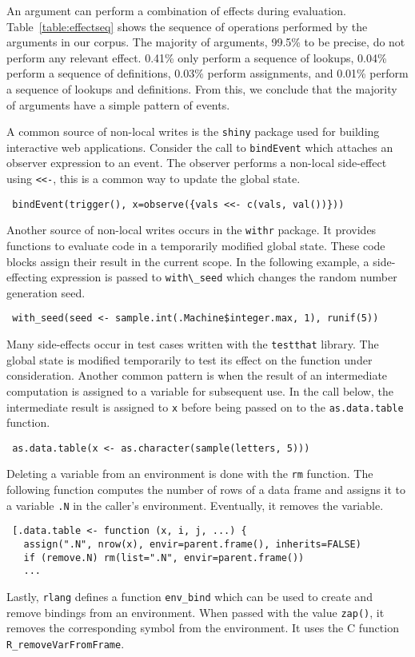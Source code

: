 \documentclass[review,creen,acmsmall]{acmart}
\newcommand{\code}[1]{\lstinline |#1|\xspace}
\renewcommand{\c}[1]{\lstinline |#1|\xspace}
\begin{document}
An argument can perform a combination of effects during evaluation.
Table~\ref{table:effectseq} shows the sequence of operations performed by the
arguments in our corpus. The majority of arguments, 99.5\% to be precise, do not
perform any relevant effect. 0.41\% only perform a sequence of lookups, 0.04\%
perform a sequence of definitions, 0.03\% perform assignments, and 0.01\%
perform a sequence of lookups and definitions. From this, we conclude that
the majority of arguments have a simple pattern of events.

A common source of non-local writes is the \c{shiny} package used for building
interactive web applications. Consider the call to \code{bindEvent} which
attaches an observer expression to an event. The observer performs a non-local
side-effect using \code{<<-}, this is a common way to update the global state.
%
\begin{lstlisting}
 bindEvent(trigger(), x=observe({vals <<- c(vals, val())}))
\end{lstlisting}
%
\noindent
Another source of non-local writes occurs in the \code{withr} package. It
provides functions to evaluate code in a temporarily modified global state. These
code blocks assign their result in the current scope. In the following example, a
side-effecting expression is passed to \code{with\_seed} which changes the
random number generation seed.
%
\begin{lstlisting}
 with_seed(seed <- sample.int(.Machine$integer.max, 1), runif(5))
\end{lstlisting}
%
\noindent
Many side-effects occur in test cases written with the \code{testthat} library.
The global state is modified temporarily to test its effect on the function
under consideration.
%
Another common pattern is when the result of an intermediate computation is
assigned to a variable for subsequent use. In the call below, the intermediate
result is assigned to \code{x} before being passed on to the
\code{as.data.table} function.
%
\begin{lstlisting}
 as.data.table(x <- as.character(sample(letters, 5)))
\end{lstlisting}
%
\noindent
Deleting a variable from an environment is done with the \code{rm} function.
The following function computes the number of rows of a data frame and assigns
it to a variable \code{.N} in the caller's environment. Eventually, it removes the
variable.
%
\begin{lstlisting}
 [.data.table <- function (x, i, j, ...) {
   assign(".N", nrow(x), envir=parent.frame(), inherits=FALSE)
   if (remove.N) rm(list=".N", envir=parent.frame())
   ...
\end{lstlisting}
\noindent
Lastly, \code{rlang} defines a function \code{env_bind} which can be used to
create and remove bindings from an environment. When passed with the value
\code{zap()}, it removes the corresponding symbol from the environment. It uses
the C function \code{R_removeVarFromFrame}.
\end{document}
